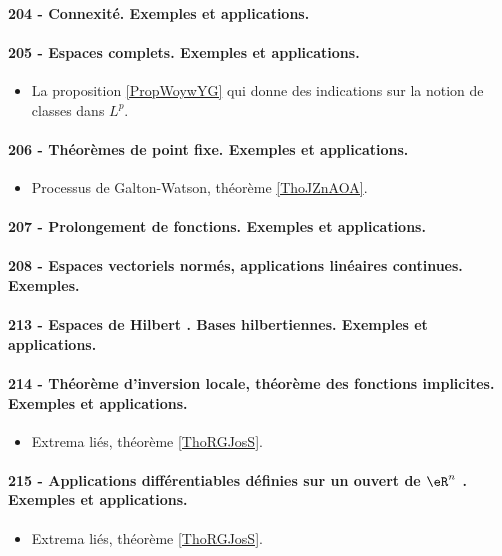 \paragraph{204 - Connexité. Exemples et applications.}
\paragraph{205 - Espaces complets. Exemples et applications.}
\begin{itemize}
    \item La proposition \ref{PropWoywYG} qui donne des indications sur la notion de classes dans \( L^p\).
\end{itemize}
\paragraph{206 - Théorèmes de point fixe. Exemples et applications.}
\begin{itemize}
    \item Processus de Galton-Watson, théorème \ref{ThoJZnAOA}.
\end{itemize}
\paragraph{207 - Prolongement de fonctions. Exemples et applications.}
\paragraph{208 - Espaces vectoriels normés, applications linéaires continues. Exemples.}
\paragraph{213 - Espaces de Hilbert . Bases hilbertiennes. Exemples et applications.}
\paragraph{214 - Théorème d’inversion locale, théorème des fonctions implicites. Exemples et applications.}
\begin{itemize}
    \item Extrema liés, théorème \ref{ThoRGJosS}.
\end{itemize}
\paragraph{215 - Applications différentiables définies sur un ouvert de $\eR^n$ . Exemples et applications.}
\begin{itemize}
    \item Extrema liés, théorème \ref{ThoRGJosS}.
\end{itemize}

